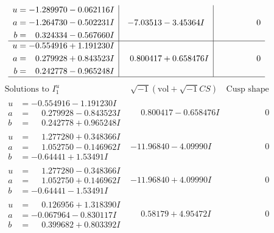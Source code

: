 \documentclass[1p]{elsarticle_modified}
\theoremstyle{definition}
\newcommand{\I}{\sqrt{-1}}
\begin{document}
$$\begin{array}{c|c|c}
\begin{aligned}
u &= -1.289970 - 0.062116 I \\
a &= -1.264730 - 0.502231 I \\
b &= \phantom{-}0.324334 - 0.567660 I\end{aligned}
 & -7.03513 - 3.45364 I & \phantom{-0.000000 } 0 \\ \hline\begin{aligned}
u &= -0.554916 + 1.191230 I \\
a &= \phantom{-}0.279928 + 0.843523 I \\
b &= \phantom{-}0.242778 - 0.965248 I\end{aligned}
 & \phantom{-}0.800417 + 0.658476 I & \phantom{-0.000000 } 0\\
 \hline 
 \end{array}$$\newpage$$\begin{array}{c|c|c}  
\text{Solutions to }I^u_{1}& \I (\text{vol} + \sqrt{-1}CS) & \text{Cusp shape}\\
 \hline 
\begin{aligned}
u &= -0.554916 - 1.191230 I \\
a &= \phantom{-}0.279928 - 0.843523 I \\
b &= \phantom{-}0.242778 + 0.965248 I\end{aligned}
 & \phantom{-}0.800417 - 0.658476 I & \phantom{-0.000000 } 0 \\ \hline\begin{aligned}
u &= \phantom{-}1.277280 + 0.348366 I \\
a &= \phantom{-}1.052750 - 0.146962 I \\
b &= -0.64441 + 1.53491 I\end{aligned}
 & -11.96840 - 4.09990 I & \phantom{-0.000000 } 0 \\ \hline\begin{aligned}
u &= \phantom{-}1.277280 - 0.348366 I \\
a &= \phantom{-}1.052750 + 0.146962 I \\
b &= -0.64441 - 1.53491 I\end{aligned}
 & -11.96840 + 4.09990 I & \phantom{-0.000000 } 0 \\ \hline\begin{aligned}
u &= \phantom{-}0.126956 + 1.318390 I \\
a &= -0.067964 - 0.830117 I \\
b &= \phantom{-}0.399682 + 0.803392 I\end{aligned}
 & \phantom{-}0.58179 + 4.95472 I & \phantom{-0.000000 } 0 \\ \hline\begin{aligned}

\end{aligned}
\end{array}$$
\end{document}
